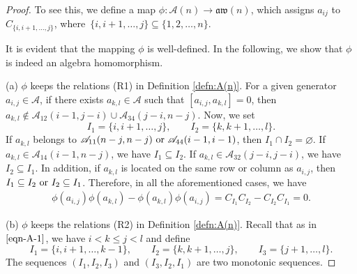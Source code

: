 \documentclass[10pt,a4paper]{amsart}
\numberwithin{equation}{section}
\def\lr#1{\left[#1\right]}
\def\A{\mathscr{A}}
\def\aw{\mathfrak{aw}}
\begin{document}
\begin{proof}
To see this, we define a map $\phi\colon \A(n) \rightarrow \aw(n)$, which assigns $a_{ij}$ to $C_{\{i, i+1, \dots, j\}}$, where~${\{i, i+1, \dots, j\}\subseteq\{1, 2, \dots, n\}}$.

It is evident that the mapping $\phi$ is well-defined.
In the following, we show that $\phi$ is indeed an algebra homomorphism.

(a) $\phi$ keeps the relations (R1) in Definition \ref{defn:A(n)}.
For a given generator $a_{i,j}\in \A$, if there exists $a_{k,l}\in \A$ such that $\lr{a_{i,j}, a_{k,l}}=0$, then $a_{k,l}\not\in \A_{12}(i-1,j-i)\cup \A_{34}(j-i,n-j)$.
Now, we set
\begin{equation*}
I_1=\{i, i+1, \dots, j\}, \qquad I_2=\{k, k+1, \dots, l\}.
\end{equation*}
If $a_{k,l}$ belongs to $\A_{11}(n-j,n-j) \hbox{ or } \A_{44}(i-1,i-1)$, then
$
I_1\cap I_2=\varnothing$.
If $a_{k,l} \in \A_{14}(i-1,n-j)$, we have
$
I_1 \subseteq I_2$.
If $a_{k,l} \in \A_{32}(j-i,j-i)$, we have
$
I_2 \subseteq I_1$.
In addition, if $a_{k,l}$ is located on the same row or column as $a_{i,j}$, then
$
I_1 \subseteq I_2 \hbox{ or } I_2 \subseteq I_1$.
Therefore, in all the aforementioned cases, we have
\begin{gather*}
 \phi(a_{i, j})\phi(a_{k, l})-\phi(a_{k, l})\phi(a_{i, j})
 =C_{I_1}C_{I_2}-C_{I_2}C_{I_1}
 =0.
\end{gather*}

(b) $\phi$ keeps the relations (R2) in Definition \ref{defn:A(n)}.
Recall that \smash{$\A_{i,k,j+1}^{k-1,j,l}$} as in $\eqref{eqn-A-1}$, we have $ i < k \leq j < l $ and define
 \begin{equation*}
 I_1=\{i, i+1, \dots, k-1\}, \qquad I_2=\{k, k+1, \dots, j\}, \qquad I_3=\{j+1, \dots, l\}.
 \end{equation*}
The sequences $(I_1, I_2, I_3)$ and $(I_3,I_2,I_1)$ are two monotonic sequences.


\end{proof}
\end{document}
